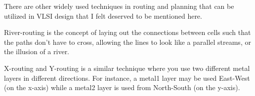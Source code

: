 
There are other widely used techniques in 
routing and planning that can be utilized in VLSI design
that I felt deserved to be mentioned here.

River-routing is the concept of laying out the connections
between cells such that the paths don't have to cross, allowing
the lines to look like a parallel streams, or the illusion of a river.

X-routing and Y-routing is a similar technique where
you use two different metal layers in different directions.
For instance, a metal1 layer may be used East-West (on the x-axis)
while a metal2 layer is used from North-South (on the y-axis).
